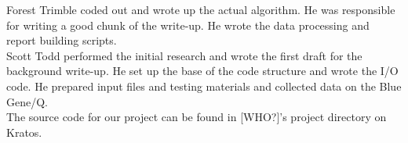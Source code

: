 \documentclass[twocolumn]{article}
\begin{document}
\noindent Forest Trimble coded out and wrote up the actual algorithm. He was 
responsible for writing a good chunk of the write-up. He wrote the data 
processing and report building scripts. \\

\noindent Scott Todd performed the initial research and wrote the first draft 
for the background write-up. He set up the base of the code structure and wrote
the I/O code. He prepared input files and testing materials and collected data 
on the Blue Gene/Q. \\

\noindent The source code for our project can be found in [WHO?]'s project 
directory on Kratos. 

\nocite{*}


\end{document}
